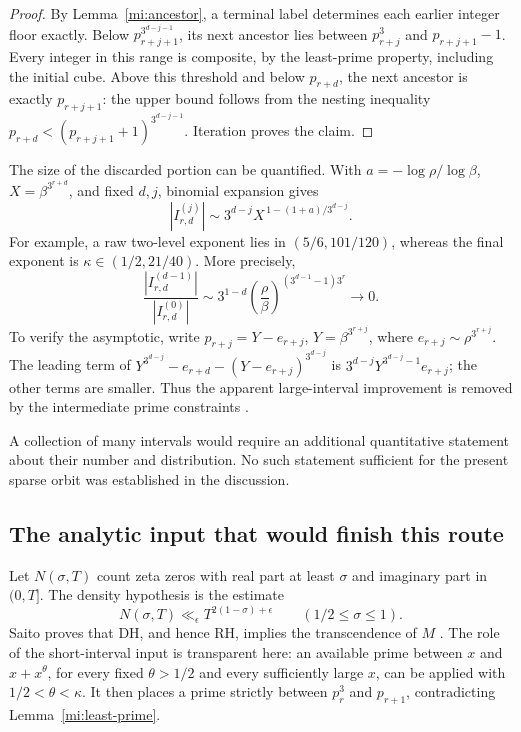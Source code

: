 \documentclass[11pt,a4paper]{article}
\numberwithin{equation}{section}
\theoremstyle{definition}
\theoremstyle{remark}
\begin{document}
\begin{proof}
By Lemma~\ref{mi:ancestor}, a terminal label determines each
earlier integer floor exactly. Below
\(p_{r+j+1}^{3^{d-j-1}}\), its next ancestor lies between
\(p_{r+j}^3\) and \(p_{r+j+1}-1\).
Every integer in this range is composite, by the least-prime
property, including the initial cube.
Above this threshold and below \(p_{r+d}\), the next ancestor
is exactly \(p_{r+j+1}\): the upper bound follows from the
nesting inequality
\(p_{r+d}<(p_{r+j+1}+1)^{3^{d-j-1}}\).
Iteration proves the claim.
\end{proof}

The size of the discarded portion can be quantified.
With \(a=-\log\rho/\log\beta\), \(X=\beta^{3^{r+d}}\), and
fixed \(d,j\), binomial expansion gives
\[
 |I_{r,d}^{(j)}|
 \sim3^{d-j}X^{\,1-(1+a)/3^{d-j}}.
\]
For example, a raw two-level exponent lies in
\((5/6,101/120)\), whereas the final exponent is
\(\kappa\in(1/2,21/40)\).
More precisely,
\[
 \frac{|I_{r,d}^{(d-1)}|}{|I_{r,d}^{(0)}|}
 \sim3^{1-d}
 \left(\frac{\rho}{\beta}\right)^{(3^{d-1}-1)3^r}
 \longrightarrow0.
\]
To verify the asymptotic, write
\(p_{r+j}=Y-e_{r+j}\), \(Y=\beta^{3^{r+j}}\),
where \(e_{r+j}\sim\rho^{3^{r+j}}\).
The leading term of
\(Y^{3^{d-j}}-e_{r+d}-(Y-e_{r+j})^{3^{d-j}}\)
is \(3^{d-j}Y^{3^{d-j}-1}e_{r+j}\); the other terms are smaller.
Thus the apparent large-interval improvement is removed by
the intermediate prime constraints \cite{VMRC075}.

A collection of many intervals would require an additional
quantitative statement about their number and distribution.
No such statement sufficient for the present sparse orbit was
established in the discussion.

\subsection{The analytic input that would finish this route}
\label{mi:rh}

Let \(N(\sigma,T)\) count zeta zeros with real part at least
\(\sigma\) and imaginary part in \((0,T]\).
The density hypothesis is the estimate
\[
 N(\sigma,T)\ll_\epsilon T^{2(1-\sigma)+\epsilon}
 \qquad(1/2\le\sigma\le1).
\]
Saito proves that DH, and hence RH, implies the transcendence
of \(M\) \cite[Theorem~1.8]{SaitoVariants}.
The role of the short-interval input is transparent here:
an available prime between \(x\) and \(x+x^\theta\), for every
fixed \(\theta>1/2\) and every sufficiently large \(x\), can be
applied with \(1/2<\theta<\kappa\).
It then places a prime strictly between \(p_r^3\) and
\(p_{r+1}\), contradicting Lemma~\ref{mi:least-prime}.
\end{document}
